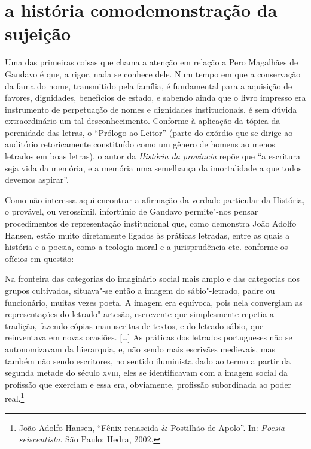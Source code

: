 
\section*{a história como\break demonstração da sujeição}

\noindent{}Uma das primeiras coisas que chama a atenção em relação a Pero Magalhães de Gandavo é que, a rigor, nada se conhece dele.
Num tempo em que a conservação da fama do nome,
transmitido pela família, é fundamental para a aquisição de favores,
dignidades, benefícios de estado, e sabendo ainda que o livro impresso
era instrumento de perpetuação de nomes e dignidades institucionais, é
sem dúvida extraordinário um tal desconhecimento. Conforme à aplicação
da tópica da perenidade das letras, o ``Prólogo ao
Leitor'' (parte do exórdio que se dirige ao auditório
retoricamente constituído como um gênero de homens ao menos letrados em
boas letras), o autor da \textit{História da província} repõe que
``a escritura seja vida da memória, e a memória uma
semelhança da imortalidade a que todos devemos aspirar''.

Como não interessa aqui encontrar a afirmação da verdade particular da
História, o provável, ou verossímil, infortúnio de Gandavo permite"-nos
pensar procedimentos de representação institucional que, como demonstra
João Adolfo Hansen, estão muito diretamente ligados às práticas
letradas, entre as quais a história e a poesia, como a teologia moral e
a jurisprudência etc. conforme os ofícios em questão:

\begin{hedraquote}
Na fronteira das categorias do imaginário social mais amplo e das
categorias dos grupos cultivados, situava"-se então a imagem do
sábio"-letrado, padre ou funcionário, muitas vezes poeta. A imagem era
equívoca, pois nela convergiam as representações do letrado"-artesão,
escrevente que simplesmente repetia a tradição, fazendo cópias
manuscritas de textos, e do letrado sábio, que reinventava em novas
ocasiões. [\ldots{}] As práticas dos letrados portugueses não se
autonomizavam da hierarquia, e, não sendo mais escrivães medievais, mas
também não sendo escritores, no sentido iluminista dado ao termo a
partir da segunda metade do século \textsc{xviii}, eles se identificavam com a
imagem social da profissão que exerciam e essa era, obviamente,
profissão subordinada ao poder real.\footnote{ João Adolfo Hansen,
``Fênix renascida \& Postilhão de Apolo''. In: \textit{Poesia seiscentista}. São Paulo: Hedra, 2002.} 
\end{hedraquote}

